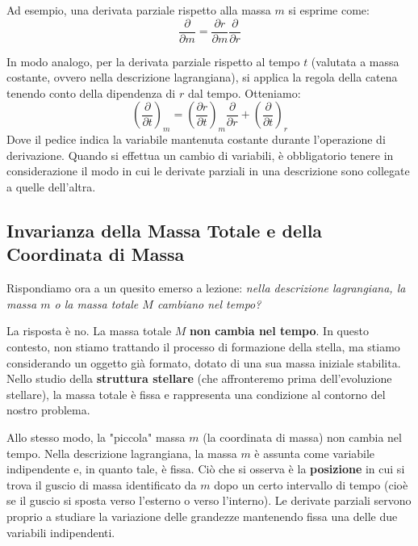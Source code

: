 Ad esempio, una derivata parziale rispetto alla massa $m$ si esprime come:
\begin{equation}
\frac{\partial}{\partial m} = \frac{\partial r}{\partial m} \frac{\partial}{\partial r}
\end{equation}

In modo analogo, per la derivata parziale rispetto al tempo $t$ (valutata a massa costante, ovvero nella descrizione lagrangiana), si applica la regola della catena tenendo conto della dipendenza di $r$ dal tempo. Otteniamo:
\begin{equation}
\left( \frac{\partial}{\partial t} \right)_m = \left( \frac{\partial r}{\partial t} \right)_m \frac{\partial}{\partial r} + \left( \frac{\partial}{\partial t} \right)_r
\end{equation}
Dove il pedice indica la variabile mantenuta costante durante l'operazione di derivazione. Quando si effettua un cambio di variabili, è obbligatorio tenere in considerazione il modo in cui le derivate parziali in una descrizione sono collegate a quelle dell'altra.

\subsection{Invarianza della Massa Totale e della Coordinata di Massa}

Rispondiamo ora a un quesito emerso a lezione: \textit{nella descrizione lagrangiana, la massa $m$ o la massa totale $M$ cambiano nel tempo?}

La risposta è no. La massa totale $M$ \textbf{non cambia nel tempo}. In questo contesto, non stiamo trattando il processo di formazione della stella, ma stiamo considerando un oggetto già formato, dotato di una sua massa iniziale stabilita. Nello studio della \textbf{struttura stellare} (che affronteremo prima dell'evoluzione stellare), la massa totale è fissa e rappresenta una condizione al contorno del nostro problema.

Allo stesso modo, la "piccola" massa $m$ (la coordinata di massa) non cambia nel tempo. Nella descrizione lagrangiana, la massa $m$ è assunta come variabile indipendente e, in quanto tale, è fissa. Ciò che si osserva è la \textbf{posizione} in cui si trova il guscio di massa identificato da $m$ dopo un certo intervallo di tempo (cioè se il guscio si sposta verso l'esterno o verso l'interno). Le derivate parziali servono proprio a studiare la variazione delle grandezze mantenendo fissa una delle due variabili indipendenti.

